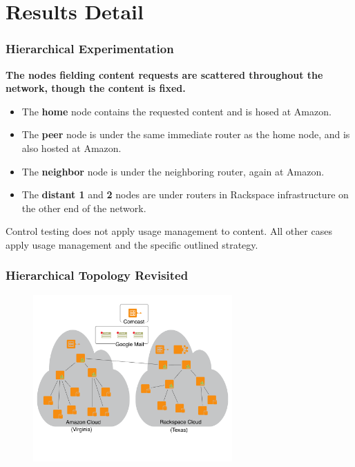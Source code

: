\documentclass[t,handout]{beamer}
\begin{document}
\section{Results Detail}

\begin{frame}
\frametitle{Hierarchical Experimentation}
{\bf The nodes fielding content requests are scattered throughout the network, though the content is fixed.}
\begin{small}
\begin{itemize}
\item The {\bf home} node contains the requested content and is hosed at Amazon.
\item The {\bf peer} node is under the same immediate router as the home node, and is also hosted at Amazon.
\item The {\bf neighbor} node is under the neighboring router, again at Amazon.
\item The {\bf distant 1} and {\bf 2} nodes are under routers in Rackspace infrastructure on the other end of the network.
\end{itemize}
\end{small}
Control testing does not apply usage management to content.  All other cases apply usage management and the specific outlined strategy.
\end{frame}

\begin{frame}
\frametitle{Hierarchical Topology Revisited}
\begin{figure}[!t]
\centering
\includegraphics[width=3in]{hierarchical-clouds}
\end{figure}
\end{frame}
\end{document}

